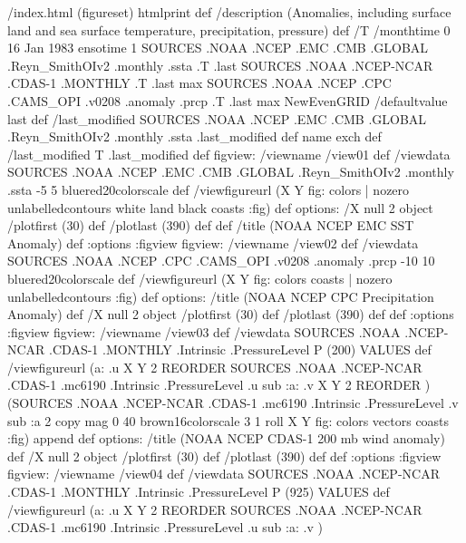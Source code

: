 \begin{ingrid}
/index.html {(figureset) htmlprint} def
/description (Anomalies, including surface land and sea surface temperature, precipitation, pressure) def
/T 
/monthtime
0
16 Jan 1983 ensotime
1
SOURCES .NOAA .NCEP .EMC .CMB .GLOBAL .Reyn_SmithOIv2 .monthly .ssta
.T .last
SOURCES .NOAA .NCEP-NCAR .CDAS-1 .MONTHLY .T .last
max
SOURCES .NOAA .NCEP .CPC .CAMS_OPI .v0208 .anomaly .prcp .T .last
max
NewEvenGRID
/defaultvalue last def
/last_modified
SOURCES .NOAA .NCEP .EMC .CMB .GLOBAL .Reyn_SmithOIv2 .monthly .ssta
.last_modified def
name exch def
/last_modified T .last_modified def
figview:
/viewname /view01 def
/viewdata SOURCES .NOAA .NCEP .EMC .CMB .GLOBAL .Reyn_SmithOIv2 .monthly .ssta
-5 5 bluered20colorscale
def
/viewfigureurl (X Y fig: colors | nozero unlabelledcontours white land black coasts :fig) def
options:
/X null 2 object
/plotfirst (30) def
/plotlast (390) def
def
/title (NOAA NCEP EMC SST Anomaly) def
:options
:figview
figview:
/viewname /view02 def
/viewdata 
SOURCES .NOAA .NCEP .CPC .CAMS_OPI .v0208 .anomaly .prcp
-10 10 bluered20colorscale
  def
/viewfigureurl (X Y fig: colors coasts | nozero unlabelledcontours :fig) def
options:
/title (NOAA NCEP CPC Precipitation Anomaly) def
/X null 2 object
/plotfirst (30) def
/plotlast (390) def
def
:options
:figview
figview:
/viewname /view03 def
/viewdata  SOURCES .NOAA .NCEP-NCAR .CDAS-1 .MONTHLY .Intrinsic .PressureLevel
  P (200) VALUES
  def
/viewfigureurl (a: .u X Y 2 REORDER SOURCES .NOAA .NCEP-NCAR .CDAS-1 .mc6190 .Intrinsic .PressureLevel .u sub :a: .v X Y 2 REORDER )
(SOURCES .NOAA .NCEP-NCAR .CDAS-1 .mc6190 .Intrinsic .PressureLevel .v sub :a 2 copy  mag 0 40 brown16colorscale 3 1 roll X Y fig: colors vectors coasts :fig) append def
options:
/title (NOAA NCEP CDAS-1 200 mb wind anomaly) def
/X null 2 object
/plotfirst (30) def
/plotlast (390) def
def
:options
:figview
figview:
/viewname /view04 def
/viewdata  SOURCES .NOAA .NCEP-NCAR .CDAS-1 .MONTHLY .Intrinsic .PressureLevel
  P (925) VALUES
  def
/viewfigureurl (a: .u X Y 2 REORDER SOURCES .NOAA .NCEP-NCAR .CDAS-1 .mc6190 .Intrinsic .PressureLevel .u sub :a: .v )

\end{ingrid}

